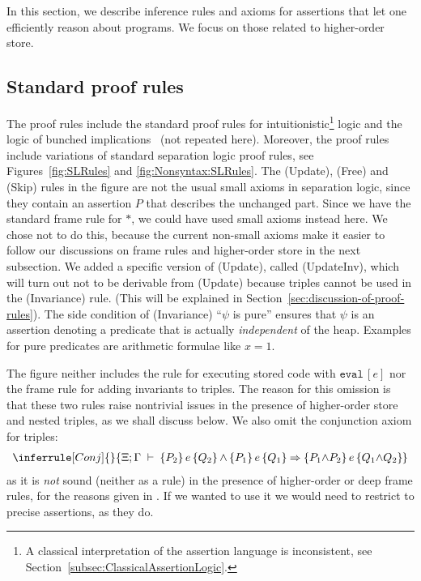 \documentclass{LMCS}
\theoremstyle{remark}
\newcommand{\UNQUOTE}[1]{\SYN{eval}\,{#1}}
\newcommand{\SYN}[1]{\ensuremath{\texttt{#1}}}
\newcommand{\triple}[3]{{\ensuremath{\!\left.\{ #1 \}\, #2\, \{  #3 \}\!\right.}}}
\newcommand{\X}{\ensuremath{\Xi}}
\begin{document}
In this section, we describe inference rules and axioms
for assertions that let one efficiently reason about 
programs. We focus on those related to higher-order store.


\subsection{Standard proof rules}
The proof rules include the standard proof rules for intuitionistic\footnote{A classical interpretation of the assertion language is inconsistent, see Section~\ref{subsec:ClassicalAssertionLogic}.} logic and the logic of bunched implications~\cite{OHearn:Pym:99} (not repeated here).
Moreover, the proof rules include variations of standard 
separation logic proof rules, see Figures~\ref{fig:SLRules} and \ref{fig:Nonsyntax:SLRules}. {The ({\sc Update}), 
({\sc Free}) and ({\sc Skip}) rules in the figure are not the usual 
small axioms in separation logic, since they contain an assertion $P$
that describes the unchanged part. Since we have the standard frame rule
for $*$, we could have used small axioms instead here. We chose not to do this, because the current non-small axioms make it easier
to follow our discussions on frame rules and higher-order store in
the next subsection.}
We added a specific version of ({\sc Update}), called ({\sc UpdateInv}), which  will turn out not to be derivable from  ({\sc Update}) because triples cannot be used in the ({\sc Invariance}) rule. (This will be explained in Section~\ref{sec:discussion-of-proof-rules}).  The side condition of ({\sc Invariance}) 
``$\psi$ is pure''  ensures that $\psi$ is an assertion denoting a predicate that is actually \emph{independent} of the heap. Examples for pure predicates are arithmetic formulae like $x=1$.

The figure neither includes the rule for executing stored code with $\UNQUOTE{[e]}$
nor  the frame rule for adding invariants to triples. 
The reason for this omission is that these two rules raise nontrivial 
issues in the presence of higher-order store and nested triples,
as we shall discuss below.
We also omit the conjunction axiom for triples:
\begin{gather*}
\inferrule[Conj]{ }  { \X;\Gamma \;\adash\; \triple{P_2}{e}{Q_2} \wedge  \triple{P_1}{e}{Q_1} \Rightarrow
  \triple{P_1{\wedge} P_2}{e}{Q_1{\wedge} Q_2} 
}
\end{gather*}
as it is \emph{not} sound (neither as a rule) in the presence of higher-order or deep frame rules, for the reasons given in \cite{OHearn:Yang:Reynolds:04}. If we wanted to use it we would need to restrict to precise assertions, as they do.
\end{document}
